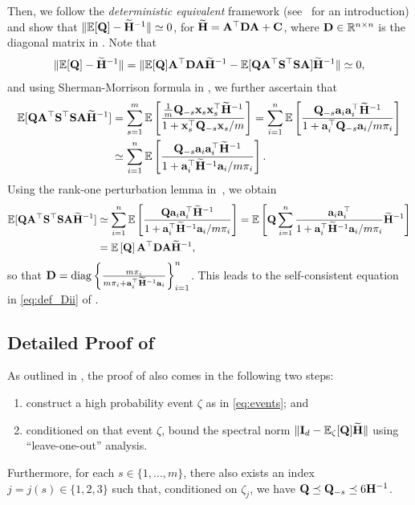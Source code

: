 \documentclass[11pt,a4paper]{article}
\begin{document}
Then, we follow the \emph{deterministic equivalent} framework (see~\citet[Chapter~2]{couillet2022RMT4ML} for an introduction) and show that $\|{\mathbb{E}}[ \mathbf{Q}]-\widetilde{\mathbf{H}}^{-1}\|\simeq 0$, for $\widetilde{\mathbf{H}}= \mathbf{A}^\top\mathbf{D}\mathbf{A}+\mathbf{C}$, where $\mathbf{D}\in {\mathbb{R}}^{n\times n}$ is the diagonal matrix in . 
Note that
 \begin{align} 
    \|{\mathbb{E}}[ \mathbf{Q}]-\widetilde{\mathbf{H}}^{-1}\|= \|{\mathbb{E}}[\mathbf{Q}]\mathbf{A}^\top  \mathbf{D}\mathbf{A}\widetilde{\mathbf{H}}^{-1}-{\mathbb{E}}[\mathbf{Q}\mathbf{A}^\top \mathbf{S}^\top\mathbf{S} \mathbf{A} ]\widetilde{\mathbf{H}}^{-1}\| \simeq 0,\nonumber
 \end{align}
and using Sherman-Morrison formula in , we further ascertain that
\begin{align*}
{\mathbb{E}}[ \mathbf{Q}\mathbf{A}^\top \mathbf{S}^\top\mathbf{S} \mathbf{A} \widetilde{\mathbf{H}}^{-1}]&=\sum^m_{s=1}{\mathbb{E}} \left[\frac{\frac{1}{m} \mathbf{Q}_{-s}\mathbf{x}_s\mathbf{x}_s^\top\widetilde{\mathbf{H}}^{-1}}{1+\mathbf{x}_s^\top \mathbf{Q}_{-s}\mathbf{x}_s/m}\right]=\sum^n_{i=1}{\mathbb{E}}\left[\frac{ \mathbf{Q}_{-s}\mathbf{a}_i\mathbf{a}_i^\top\widetilde{\mathbf{H}}^{-1}}{1+\mathbf{a}_i^\top \mathbf{Q}_{-s}\mathbf{a}_i/m\pi_{i}}\right] \\ 
&\simeq \sum^n_{i=1}{\mathbb{E}}\left[\frac{ \mathbf{Q}_{-s}\mathbf{a}_i\mathbf{a}_i^\top\widetilde{\mathbf{H}}^{-1}}{1+\mathbf{a}_i^\top \widetilde{\mathbf{H}}^{-1}\mathbf{a}_i/m\pi_{i}}\right].
\end{align*}
Using the rank-one perturbation lemma in~\citet[Lemma~2.6]{silverstein1995empirical}, we obtain
\begin{align*}
{\mathbb{E}}[ \mathbf{Q}\mathbf{A}^\top \mathbf{S}^\top\mathbf{S} \mathbf{A} \widetilde{\mathbf{H}}^{-1}] &\simeq \sum^n_{i=1}{\mathbb{E}}\left[\frac{ \mathbf{Q}\mathbf{a}_i\mathbf{a}_i^\top\widetilde{\mathbf{H}}^{-1}}{1+\mathbf{a}_i^\top\widetilde{\mathbf{H}}^{-1}\mathbf{a}_i/m\pi_{i}}\right]={\mathbb{E}}\left[\mathbf{Q}\sum^n_{i=1}\frac{ \mathbf{a}_i\mathbf{a}_i^\top}{1+\mathbf{a}_i^\top\widetilde{\mathbf{H}}^{-1}\mathbf{a}_i/m\pi_{i}}\widetilde{\mathbf{H}}^{-1}\right]\\ 
&={\mathbb{E}}\left[\mathbf{Q}\right]\mathbf{A}^\top\mathbf{D}\mathbf{A}\widetilde{\mathbf{H}}^{-1},\nonumber
\end{align*}
so that $\mathbf{D}=\operatorname{diag}\left\{\frac{m\pi_i}{m\pi_i+\mathbf{a}_i^\top\widetilde{\mathbf{H}}^{-1}\mathbf{a}_i}\right\}^n_{i=1}$.
This leads to the self-consistent equation in \eqref{eq:def_Dii} of .


\subsection{Detailed Proof of }
\label{subsec:detailed_proof_theo:inverse-bias}

As outlined in , the proof of  also comes in the following two steps:
\begin{enumerate}
  \item construct a high probability event $\zeta$ as in \eqref{eq:events}; and
  \item conditioned on that event $\zeta$, bound the spectral norm $  \| \mathbf{I}_d-{\mathbb{E}}_{\zeta} [\mathbf{Q}]\widetilde{\mathbf{H}} \|$ using ``leave-one-out'' analysis.
\end{enumerate}
Furthermore, for each $s\in \{1,\ldots, m\}$, there also exists an index $j=j(s)\in\{1,2,3\}$ such that,  conditioned on $  \zeta_j$,  we have $\mathbf{Q}\preceq  \mathbf{Q}_{-s}\preceq6\mathbf{H}^{-1}$.
  
\end{document}
